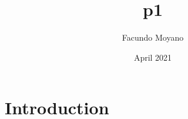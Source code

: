\documentclass{article}
\title{p1}
\author{Facundo Moyano}
\date{April 2021}
\begin{document}
\maketitle

\section{Introduction}
\end{document}
